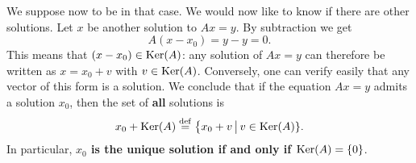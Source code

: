 \documentclass[11pt,nocut]{article}
\begin{document}
We suppose now to be in that case. We would now like to know if there are other solutions. Let $x$ be another solution to $Ax = y$. By subtraction we get 
$$
A(x - x_0) = y - y = 0.
$$
This means that $(x - x_0) \in {{\rm Ker}}(A)$: any solution of $Ax = y$ can therefore be written as $x = x_0 + v$ with $v \in {{\rm Ker}}(A)$. Conversely, one can verify easily that any vector of this form is a solution. We conclude that if the equation $Ax = y$ admits a solution $x_0$, then the set of \textbf{all} solutions is
$$
x_0 + {{\rm Ker}}(A) \overset{\rm def}{=} \big\{ x_0 + v \, \big| \, v \in {{\rm Ker}}(A) \}.
$$
In particular, \textbf{$x_0$ is the unique solution if and only if ${{\rm Ker}}(A) = \{0\}$}.



\vspace{1cm}
\centerline{}

%
%
\end{document}
